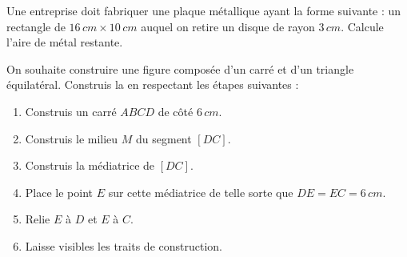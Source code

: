 \documentclass[../../syllabus_1.tex]{subfiles}
\begin{document}
\begin{exercise}
    Une entreprise doit fabriquer une plaque métallique ayant la
    forme suivante : un rectangle de $16\,cm\times10\,cm$ auquel on
    retire un disque de rayon $3\,cm$. Calcule l'aire de métal restante.
\end{exercise}

\begin{exercise}
    On souhaite construire une figure composée d'un carré et d'un
    triangle équilatéral. Construis la en respectant les étapes suivantes :


    \begin{enumerate}
        \item Construis un carré $ABCD$ de côté $6\,cm$.
        \item Construis le milieu $M$ du segment $[DC]$.
        \item Construis la médiatrice de $[DC]$.
        \item Place le point $E$ sur cette médiatrice de telle sorte que
        $DE=EC=6\,cm$.
        \item Relie $E$ à $D$ et $E$ à $C$.
        \item Laisse visibles les traits de construction.
    \end{enumerate}
\end{exercise}
\end{document}
